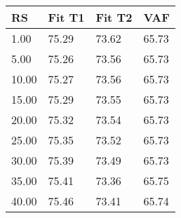 \begin{tabular}{llll}
RS & Fit T1 & Fit T2 & VAF \\ 
\hline 
 1.00 & 75.29 & 73.62 & 65.73 \\ 
 5.00 & 75.26 & 73.56 & 65.73 \\ 
10.00 & 75.27 & 73.56 & 65.73 \\ 
15.00 & 75.29 & 73.55 & 65.73 \\ 
20.00 & 75.32 & 73.54 & 65.73 \\ 
25.00 & 75.35 & 73.52 & 65.73 \\ 
30.00 & 75.39 & 73.49 & 65.73 \\ 
35.00 & 75.41 & 73.36 & 65.75 \\ 
40.00 & 75.46 & 73.41 & 65.74 \\ 
\hline 
\end{tabular}